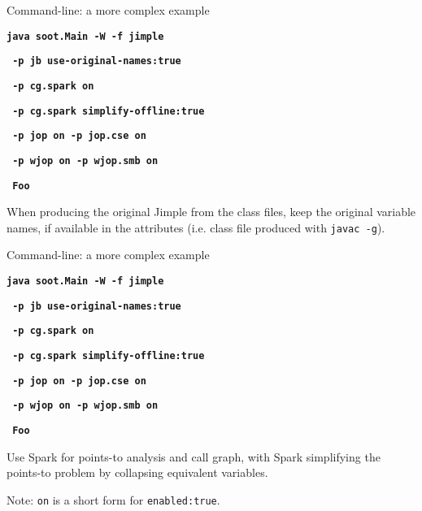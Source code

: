 \begin{slide}{Command-line: a more complex example}

\begin{small}
\textbf{\texttt{java soot.Main -W -f jimple}}

\textbf{\red\texttt{     -p jb use-original-names:true }}

\textbf{\texttt{     -p cg.spark on }}

\textbf{\texttt{     -p cg.spark simplify-offline:true}}

\textbf{\texttt{     -p jop on -p jop.cse on   }}

\textbf{\texttt{     -p wjop on  -p wjop.smb on }}

\textbf{\texttt{     Foo }}
\end{small}

\vspace{.2in}

When producing
the original Jimple from the class files, 
keep the original variable names, if available in the 
attributes (i.e. class file produced with \texttt{javac -g}).

\end{slide}


\begin{slide}{Command-line: a more complex example}

\begin{small}
\textbf{\texttt{java soot.Main -W -f jimple}}

\textbf{\texttt{     -p jb use-original-names:true }}

\textbf{\red\texttt{     -p cg.spark on }}

\textbf{\red\texttt{     -p cg.spark simplify-offline:true}}

\textbf{\texttt{     -p jop on -p jop.cse on   }}

\textbf{\texttt{     -p wjop on  -p wjop.smb on }}

\textbf{\texttt{     Foo }}
\end{small}

\vspace{.2in}

Use Spark for points-to analysis and
call graph,  with Spark simplifying the points-to problem by collapsing
equivalent variables.  

Note: \texttt{on} is a short form for \texttt{enabled:true}.

\end{slide}


